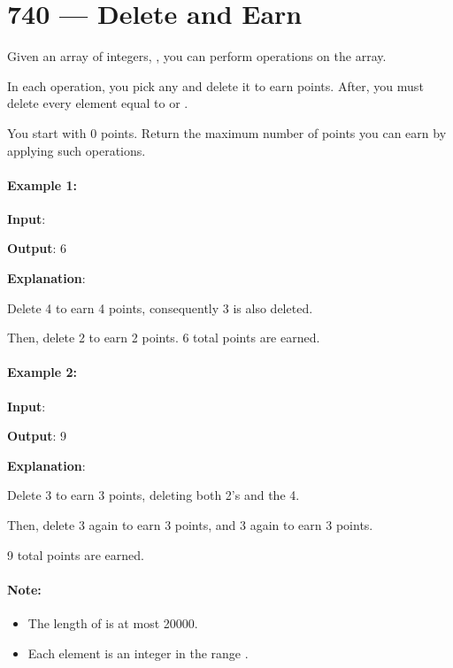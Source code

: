 \section{740 --- Delete and Earn}
Given an array of integers, , you can perform operations on the array.

In each operation, you pick any  and delete it to earn  points. After, you must delete every element equal to  or .

You start with 0 points. Return the maximum number of points you can earn by applying such operations.

\paragraph{Example 1:}
\begin{flushleft}


\textbf{Input}: 

\textbf{Output}: 6

\textbf{Explanation}:
 
Delete 4 to earn 4 points, consequently 3 is also deleted.

Then, delete 2 to earn 2 points. 6 total points are earned.
\end{flushleft}
 

\paragraph{Example 2:}
\begin{flushleft}


\textbf{Input}: 

\textbf{Output}: 9

\textbf{Explanation}:
 
Delete 3 to earn 3 points, deleting both 2's and the 4.

Then, delete 3 again to earn 3 points, and 3 again to earn 3 points.

9 total points are earned.
\end{flushleft}
 

\paragraph{Note:}

\begin{itemize}
\item The length of  is at most 20000.
\item Each element  is an integer in the range \fcj{[1, 10000]}.
\end{itemize}


